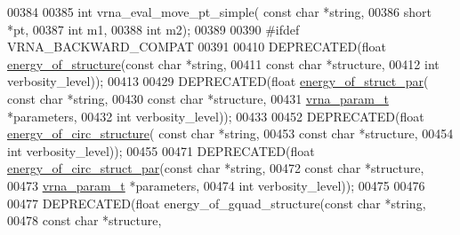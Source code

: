 \begin{DoxyCode}
00384 
00385 \textcolor{keywordtype}{int} vrna\_eval\_move\_pt\_simple( \textcolor{keyword}{const} \textcolor{keywordtype}{char} *\textcolor{keywordtype}{string},
00386                               \textcolor{keywordtype}{short} *pt,
00387                               \textcolor{keywordtype}{int} m1,
00388                               \textcolor{keywordtype}{int} m2);
00389 
00390 \textcolor{preprocessor}{#ifdef VRNA\_BACKWARD\_COMPAT}
00391 
00410 DEPRECATED(\textcolor{keywordtype}{float} \hyperlink{eval_8h_af93986cb3cb29770ec9cca69c9fab8cf}{energy\_of\_structure}(\textcolor{keyword}{const} \textcolor{keywordtype}{char} *\textcolor{keywordtype}{string},
00411                           \textcolor{keyword}{const} \textcolor{keywordtype}{char} *structure,
00412                           \textcolor{keywordtype}{int} verbosity\_level));
00413 
00429 DEPRECATED(\textcolor{keywordtype}{float} \hyperlink{eval_8h_af9d064d3c496de42eca6734a96fd2090}{energy\_of\_struct\_par}( \textcolor{keyword}{const} \textcolor{keywordtype}{char} *\textcolor{keywordtype}{string},
00430                             \textcolor{keyword}{const} \textcolor{keywordtype}{char} *structure,
00431                             \hyperlink{group__energy__parameters_structvrna__param__s}{vrna\_param\_t} *parameters,
00432                             \textcolor{keywordtype}{int} verbosity\_level));
00433 
00452 DEPRECATED(\textcolor{keywordtype}{float} \hyperlink{eval_8h_aeb14f3664aec67fc03268ac75253f0f8}{energy\_of\_circ\_structure}( \textcolor{keyword}{const} \textcolor{keywordtype}{char} *\textcolor{keywordtype}{string},
00453                                 \textcolor{keyword}{const} \textcolor{keywordtype}{char} *structure,
00454                                 \textcolor{keywordtype}{int} verbosity\_level));
00455 
00471 DEPRECATED(\textcolor{keywordtype}{float} \hyperlink{eval_8h_a3f01f9744ba6a40555eb4d81fc77f6df}{energy\_of\_circ\_struct\_par}(\textcolor{keyword}{const} \textcolor{keywordtype}{char} *\textcolor{keywordtype}{string},
00472                                 \textcolor{keyword}{const} \textcolor{keywordtype}{char} *structure,
00473                                 \hyperlink{group__energy__parameters_structvrna__param__s}{vrna\_param\_t} *parameters,
00474                                 \textcolor{keywordtype}{int} verbosity\_level));
00475 
00476 
00477 DEPRECATED(\textcolor{keywordtype}{float} energy\_of\_gquad\_structure(\textcolor{keyword}{const} \textcolor{keywordtype}{char} *\textcolor{keywordtype}{string},
00478                                 \textcolor{keyword}{const} \textcolor{keywordtype}{char} *structure,

\end{DoxyCode}
